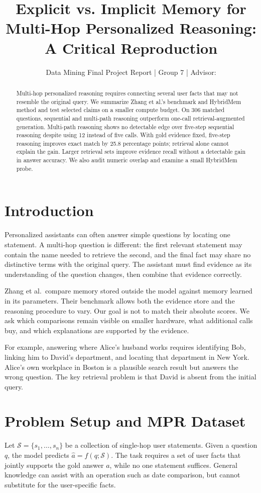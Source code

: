 \documentclass[sigconf,nonacm,10pt,balance=false]{acmart}
\title[Memory for Multi-Hop Personalized Reasoning]{Explicit vs. Implicit Memory for Multi-Hop Personalized Reasoning: A Critical Reproduction}
\subtitle{Data Mining Final Project Report | Group 7 | Advisor: \vn{Nguyễn Võ Lê Duy}}
\author{\mbox{\vn{Nguyễn Xuân Phi}}\enspace\mbox{\vn{Lê Hải Phong}}\enspace\mbox{\vn{Trần Nguyên Phong}}\enspace\mbox{\vn{Phan Văn Phú}}}
\begin{document}
\begin{abstract}
Multi-hop personalized reasoning requires connecting several user facts that may not resemble the original query. We summarize Zhang et al.'s benchmark and HybridMem method and test selected claims on a smaller compute budget. On 306 matched questions, sequential and multi-path reasoning outperform one-call retrieval-augmented generation. Multi-path reasoning shows no detectable edge over five-step sequential reasoning despite using 12 instead of five calls. With gold evidence fixed, five-step reasoning improves exact match by 25.8 percentage points; retrieval alone cannot explain the gain. Larger retrieval sets improve evidence recall without a detectable gain in answer accuracy. We also audit numeric overlap and examine a small HybridMem probe.
\end{abstract}
\maketitle
\section{Introduction}
Personalized assistants can often answer simple questions by locating one statement. A multi-hop question is different: the first relevant statement may contain the name needed to retrieve the second, and the final fact may share no distinctive terms with the original query. The assistant must find evidence as its understanding of the question changes, then combine that evidence correctly.

Zhang et al.\ compare memory stored outside the model against memory learned in its parameters. Their benchmark allows both the evidence store and the reasoning procedure to vary. Our goal is not to match their absolute scores. We ask which comparisons remain visible on smaller hardware, what additional calls buy, and which explanations are supported by the evidence.

For example, answering where Alice's husband works requires identifying Bob, linking him to David's department, and locating that department in New York. Alice's own workplace in Boston is a plausible search result but answers the wrong question. The key retrieval problem is that David is absent from the initial query.

\newpage
\section{Problem Setup and MPR Dataset}
Let $\mathcal S=\{s_1,\ldots,s_n\}$ be a collection of single-hop user statements. Given a question $q$, the model predicts $\hat a=f(q;\mathcal S)$. The task requires a set of user facts that jointly supports the gold answer $a$, while no one statement suffices. General knowledge can assist with an operation such as date comparison, but cannot substitute for the user-specific facts.
\end{document}
